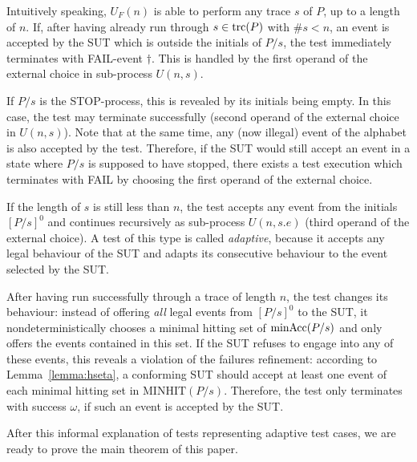 Intuitively speaking, $U_F(n)$ is able to perform any trace $s$ of $P$, 
up to a length of $n$. If, after having already run through $s\in\text{trc}(P)$ with $\#s < n$,
an event is accepted by the SUT which is outside the initials of $P/s$, the test 
immediately terminates with FAIL-event $\dag$. This is handled by the first operand of the
external choice in sub-process $U(n,s)$.

If $P/s$ is the STOP-process, this is revealed by its initials being empty. In this case, the test may terminate 
successfully (second operand of the external choice in $U(n,s)$). Note that at the same time, any (now illegal) event of the alphabet is also accepted by the test.
Therefore,
if the SUT would still accept an event in a state where $P/s$ is supposed to have stopped, there exists a test execution which terminates with FAIL by choosing the first
operand of the external choice.

If the length of $s$ is still less than $n$, the test accepts any event from the initials
$[P/s]^0$ and continues recursively as sub-process $U(n,s.e)$ (third operand of the external choice). A test of this type is called \emph{adaptive}, because it accepts any legal behaviour of the SUT and adapts its consecutive behaviour to the event selected by the SUT.
 
After having  run successfully 
through a trace of length $n$, the test changes its behaviour:
instead of offering {\it all} legal events from $[P/s]^0$ to the SUT, 
it nondeterministically chooses 
a minimal hitting set of $\text{minAcc}(P/s)$ and only offers the events contained in this set.
If the SUT refuses to engage into any of these events, this reveals a violation of the
failures refinement: according to Lemma~\ref{lemma:hseta}, a conforming SUT should accept
at least one event of each minimal hitting set in $\text{MINHIT}(P/s)$. Therefore, the test
only terminates with success $\omega$, if such an event is accepted by the SUT.

After this informal explanation of tests representing adaptive test cases, we are ready to prove the main theorem of this paper.

